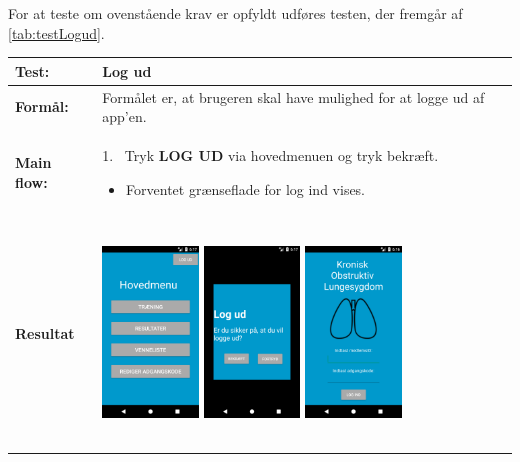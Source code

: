 \noindent
For at teste om ovenstående krav er opfyldt udføres testen, der fremgår af \autoref{tab:testLogud}.

  \begin{longtable}{ | l | p{13cm} |} \hline
    \textbf{Test:} & Log ud \\ \hline
  \textbf{Formål:} & Formålet er, at brugeren skal have mulighed for at logge ud af app’en.
 \\ \hline
 	\textbf{Main flow:} & 1.~ Tryk \textbf{LOG UD} via hovedmenuen og tryk bekræft.
 	\begin{itemize} [label={\checkmark}]
 	\item Forventet grænseflade for log ind vises.
 	\end{itemize}	
\\ \hline
\textbf{Resultat} &  \hspace{1.5mm}  \raisebox{-\totalheight}    {\includegraphics[width=0.24\textwidth, height=60mm]{figures/test/logud2}} 
\hspace{5mm}
        \raisebox{-\totalheight}
    {\includegraphics[width=0.24\textwidth, height=60mm]{figures/test/logud3}} 
    \hspace{5mm}
        \raisebox{-\totalheight}
    {\includegraphics[width=0.24\textwidth, height=60mm]{figures/test/logud1}} \vspace{3mm}

\end{longtable}
